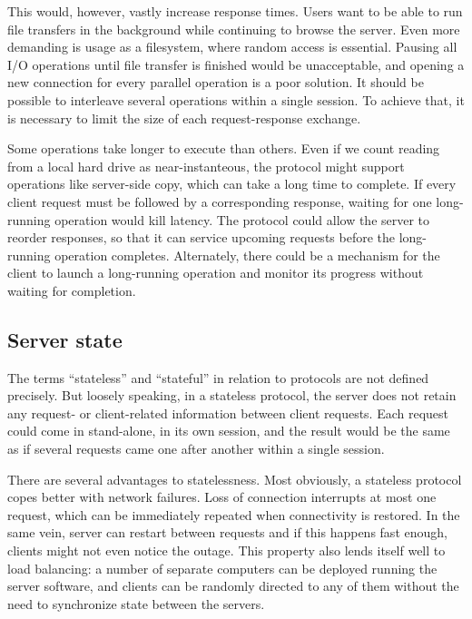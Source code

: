 This would, however, vastly increase response times. Users want to be able to run file transfers in the
background while continuing to browse the server. Even more demanding is usage as a filesystem, where random
access is essential. Pausing all I/O operations until file transfer is finished would be unacceptable, and
opening a new connection for every parallel operation is a poor solution. It should be possible to interleave
several operations within a single session. To achieve that, it is necessary to limit the size of each
request-response exchange.

Some operations take longer to execute than others. Even if we count reading from a local hard drive as
near-instanteous, the protocol might support operations like server-side copy, which can take a long time to
complete. If every client request must be followed by a corresponding response, waiting for one long-running
operation would kill latency. The protocol could allow the server to reorder responses, so that it can service
upcoming requests before the long-running operation completes. Alternately, there could be a mechanism for the
client to launch a long-running operation and monitor its progress without waiting for completion.

\subsection{Server state}

The terms ``stateless'' and ``stateful'' in relation to protocols are not defined precisely. But loosely
speaking, in a stateless protocol, the server does not retain any request- or client-related information
between client requests.  Each request could come in stand-alone, in its own session, and the result would be
the same as if several requests came one after another within a single session.

There are several advantages to statelessness. Most obviously, a stateless protocol copes better with network
failures. Loss of connection interrupts at most one request, which can be immediately repeated when
connectivity is restored. In the same vein, server can restart between requests and if this happens fast
enough, clients might not even notice the outage. This property also lends itself well to load balancing:
a number of separate computers can be deployed running the server software, and clients can be randomly
directed to any of them without the need to synchronize state between the servers.

